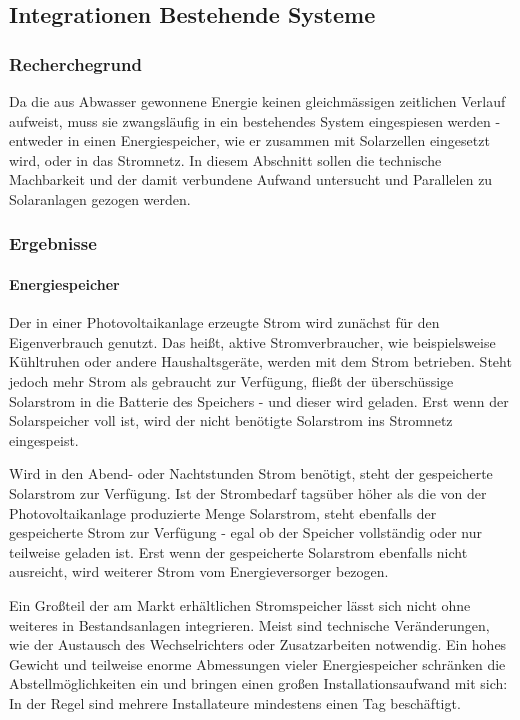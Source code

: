 \subsection{Integrationen Bestehende Systeme}

\subsubsection{Recherchegrund}

Da die aus Abwasser gewonnene Energie keinen gleichmässigen zeitlichen Verlauf aufweist, muss sie zwangsläufig in ein bestehendes System eingespiesen werden - entweder in einen Energiespeicher, wie er zusammen mit Solarzellen eingesetzt wird, oder in das Stromnetz. In diesem Abschnitt sollen die technische Machbarkeit und der damit verbundene Aufwand untersucht und Parallelen zu Solaranlagen gezogen werden.

\subsubsection{Ergebnisse}

\paragraph{Energiespeicher}
Der in einer Photovoltaikanlage erzeugte Strom wird zunächst für den Eigenverbrauch genutzt. Das heißt, aktive Stromverbraucher, wie beispielsweise Kühltruhen oder andere Haushaltsgeräte, werden mit dem Strom betrieben. Steht jedoch mehr Strom als gebraucht zur Verfügung, flie{\ss}t der überschüssige Solarstrom in die Batterie des Speichers - und dieser wird geladen. Erst wenn der Solarspeicher voll ist, wird der nicht benötigte Solarstrom ins Stromnetz eingespeist.

Wird in den Abend- oder Nachtstunden Strom benötigt, steht der gespeicherte Solarstrom zur Verfügung. Ist der Strombedarf tagsüber höher als die von der Photovoltaikanlage produzierte Menge Solarstrom, steht ebenfalls der gespeicherte Strom zur Verfügung - egal ob der Speicher vollständig oder nur teilweise geladen ist. Erst wenn der gespeicherte Solarstrom ebenfalls nicht ausreicht, wird weiterer Strom vom Energieversorger bezogen.

Ein Großteil der am Markt erhältlichen Stromspeicher lässt sich nicht ohne weiteres in Bestandsanlagen integrieren. Meist sind technische Veränderungen, wie der Austausch des Wechselrichters oder Zusatzarbeiten notwendig. Ein hohes Gewicht und teilweise enorme Abmessungen vieler Energiespeicher schränken die Abstellmöglichkeiten ein und bringen einen großen Installationsaufwand mit sich: In der Regel sind mehrere Installateure mindestens einen Tag beschäftigt. \cite{solarwatt}

